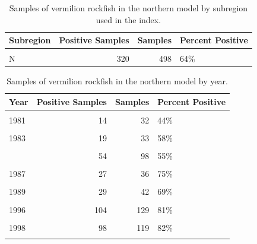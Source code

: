 \documentclass[11pt,
  english,
]{article}
\begin{document}
\newpage

\begin{table}

\caption{\label{tab:tab-region-mrfss}Samples of vermilion rockfish in the northern model by subregion used in the index.}
\centering
\begin{tabular}[t]{lrrl}
\toprule
Subregion & Positive Samples & Samples & Percent Positive\\
\midrule
\cellcolor{gray!6}{C} & \cellcolor{gray!6}{442} & \cellcolor{gray!6}{585} & \cellcolor{gray!6}{76\%}\\
N & 320 & 498 & 64\%\\
\bottomrule
\end{tabular}
\end{table}

\begin{table}

\caption{\label{tab:tab-year-mrfss}Samples of vermilion rockfish in the northern model by year.}
\centering
\begin{tabular}[t]{lrrl}
\toprule
Year & Positive Samples & Samples & Percent Positive\\
\midrule
\cellcolor{gray!6}{1980} & \cellcolor{gray!6}{31} & \cellcolor{gray!6}{57} & \cellcolor{gray!6}{54\%}\\
1981 & 14 & 32 & 44\%\\
\cellcolor{gray!6}{1982} & \cellcolor{gray!6}{24} & \cellcolor{gray!6}{41} & \cellcolor{gray!6}{59\%}\\
1983 & 19 & 33 & 58\%\\
\cellcolor{gray!6}{1984} & \cellcolor{gray!6}{34} & \cellcolor{gray!6}{59} & \cellcolor{gray!6}{58\%}\\
\addlinespace
1985 & 54 & 98 & 55\%\\
\cellcolor{gray!6}{1986} & \cellcolor{gray!6}{50} & \cellcolor{gray!6}{87} & \cellcolor{gray!6}{57\%}\\
1987 & 27 & 36 & 75\%\\
\cellcolor{gray!6}{1988} & \cellcolor{gray!6}{38} & \cellcolor{gray!6}{48} & \cellcolor{gray!6}{79\%}\\
1989 & 29 & 42 & 69\%\\
\addlinespace
\cellcolor{gray!6}{1995} & \cellcolor{gray!6}{31} & \cellcolor{gray!6}{41} & \cellcolor{gray!6}{76\%}\\
1996 & 104 & 129 & 81\%\\
\cellcolor{gray!6}{1997} & \cellcolor{gray!6}{127} & \cellcolor{gray!6}{162} & \cellcolor{gray!6}{78\%}\\
1998 & 98 & 119 & 82\%\\
\cellcolor{gray!6}{1999} & \cellcolor{gray!6}{82} & \cellcolor{gray!6}{99} & \cellcolor{gray!6}{83\%}\\
\bottomrule
\end{tabular}
\end{table}
\end{document}
